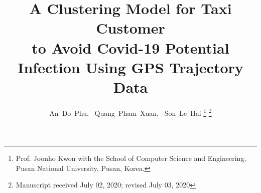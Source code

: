 \documentclass[journal]{IEEEtran}
\begin{document}
%
\title{A Clustering Model for Taxi Customer \\ to Avoid Covid-19 Potential Infection Using GPS Trajectory Data}
%
%
%

\author{An~Do~Phu,~
        Quang~Pham~Xuan,~
        Son~Le~Hai%
\thanks{Prof. Joonho Kwon with the School of Computer Science and Engineering, Pusan National University, Pusan, Korea.}%
\thanks{Manuscript received July 02, 2020; revised July 03, 2020}
}

% 
%
\end{document}
